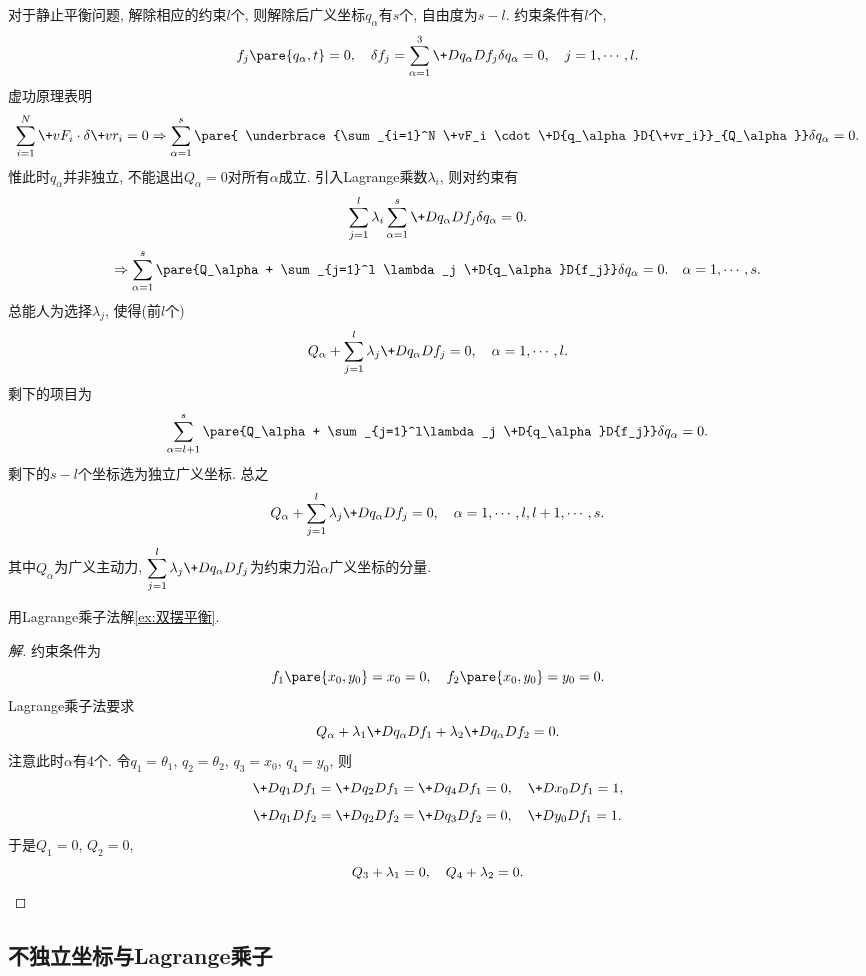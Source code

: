 \documentclass{ctexart}
\begin{document}
对于静止平衡问题, 解除相应的约束$l$个, 则解除后广义坐标$q_\alpha$有$s$个, 自由度为$s-l$. 约束条件有$l$个,
\[ f_j\pare{q_\alpha, t} = 0,\quad \delta f_j = \sum_{\alpha=1}^3 \+D{q_\alpha}D{f_j}\delta q_\alpha = 0,\quad j = 1,\cdots, l. \]
虚功原理表明
\[ \sum_{i=1}^N \+vF_i\cdot\delta\+vr_i = 0\Rightarrow \sum_{\alpha=1}^s\pare{ \underbrace{\sum_{i=1}^N \+vF_i \cdot \+D{q_\alpha}D{\+vr_i}}_{Q_\alpha}}\delta q_\alpha = 0. \]
惟此时$q_\alpha$并非独立, 不能退出$Q_\alpha = 0$对所有$\alpha$成立. 引入Lagrange乘数$\lambda_i$, 则对约束有
\[ \sum_{j=1}^l \lambda_i \sum_{\alpha=1}^s \+D{q_\alpha}D{f_j} \delta q_\alpha = 0. \]
\[ \Rightarrow \sum_{\alpha=1}^s \pare{Q_\alpha + \sum_{j=1}^l \lambda_j \+D{q_\alpha}D{f_j}}\delta q_\alpha = 0. \quad \alpha = 1,\cdots, s. \]
总能人为选择$\lambda_j$, 使得(前$l$个)
\[ Q_\alpha + \sum_{j=1}^l \lambda_j \+D{q_\alpha}D{f_j} = 0,\quad \alpha = 1,\cdots, l. \]
剩下的项目为
\[ \sum_{\alpha = l+1}^s \pare{Q_\alpha + \sum_{j=1}^l\lambda_j \+D{q_\alpha}D{f_j}} \delta q_\alpha = 0. \]
剩下的$s-l$个坐标选为独立广义坐标. 总之
\[ Q_\alpha + \sum_{j=1}^l \lambda_j \+D{q_\alpha}D{f_j} = 0,\quad \alpha = 1,\cdots,l,l+1,\cdots, s. \]
其中$Q_\alpha$为广义主动力, $\displaystyle \sum_{j=1}^l \lambda_j \+D{q_\alpha}D{f_j}$为约束力沿$\alpha$广义坐标的分量.
\begin{sample}
    \begin{ex}
        用Lagrange乘子法解\cref{ex:双摆平衡}.
    \end{ex}
    \begin{proof}[解]
        约束条件为
        \[ f_1\pare{x_0, y_0} = x_0 = 0,\quad f_2\pare{x_0,y_0} = y_0 = 0. \]
        Lagrange乘子法要求
        \[ Q_\alpha + \lambda_1 \+D{q_\alpha}D{f_1} + \lambda_2 \+D{q_\alpha}D{f_2} = 0. \]
        注意此时$\alpha$有$4$个. 令$q_1 = \theta_1$, $q_2 = \theta_2$, $q_3 = x_0$, $q_4 = y_0$, 则
        \[ \+D{q_1}D{f_1} = \+D{q_2}D{f_1} = \+D{q_4}D{f_1} = 0,\quad \+D{x_0}D{f_1} = 1, \]
        \[ \+D{q_1}D{f_2} = \+D{q_2}D{f_2} = \+D{q_3}D{f_2} = 0,\quad \+D{y_0}D{f_1} = 1. \]
        于是$Q_1 = 0$, $Q_2 = 0$,
        \[ Q_3 + \lambda_1 = 0,\quad Q_4 + \lambda_2 = 0.\qedhere \]
    \end{proof}
\end{sample}




\subsection{不独立坐标与Lagrange乘子} %
\label{sub:不独立坐标与lagrange乘子}
\end{document}
